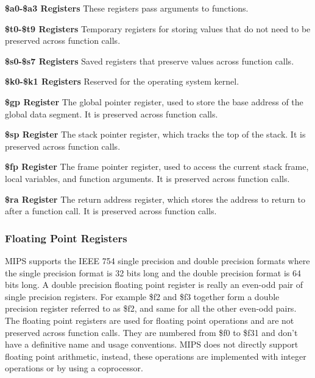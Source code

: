 \textbf{\$a0-\$a3 Registers}\newline
These registers pass arguments to functions. 

\textbf{\$t0-\$t9 Registers}\newline
Temporary registers for storing values that do not need to be preserved across function calls.

\textbf{\$s0-\$s7 Registers}\newline
Saved registers that preserve values across function calls.

\textbf{\$k0-\$k1 Registers}\newline
Reserved for the operating system kernel.

\textbf{\$gp Register}\newline
The global pointer register, used to store the base address of the global data segment. It is preserved across function calls.

\textbf{\$sp Register}\newline
The stack pointer register, which tracks the top of the stack. It is preserved across function calls.

\textbf{\$fp Register}\newline
The frame pointer register, used to access the current stack frame, local variables, and function arguments. It is preserved across function calls.

\textbf{\$ra Register}\newline
The return address register, which stores the address to return to after a function call. It is preserved across function calls.

\subsubsection{Floating Point Registers}
MIPS supports the IEEE 754 single precision and double precision formats\cite{patterson1994computer} where the single precision format is 32 bits long and the double precision format is 64 bits long. A double precision floating point register is really an even-odd pair of single precision registers\cite{patterson1994computer}. For example \$f2 and \$f3 together form a double precision register referred to as \$f2, and same for all the other even-odd pairs. The floating point registers are used for floating point operations and are not preserved across function calls. They are numbered from \$f0 to \$f31 and don't have a definitive name and usage conventions. MIPS does not directly support floating point arithmetic\cite{hennessy1982mips}, instead, these operations are implemented with integer operations or by using a coprocessor.

